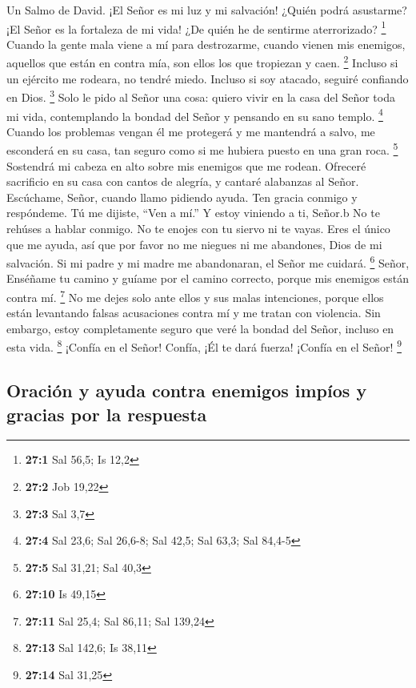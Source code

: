 Un Salmo de David.  ¡El Señor es mi luz y mi salvación!
¿Quién podrá asustarme? ¡El Señor es la fortaleza de mi vida! ¿De quién
he de sentirme aterrorizado? \footnote{\textbf{27:1} Sal 56,5; Is 12,2}
 Cuando la gente mala viene a mí para destrozarme, cuando
vienen mis enemigos, aquellos que están en contra mía, son ellos los que
tropiezan y caen. \footnote{\textbf{27:2} Job 19,22} 
Incluso si un ejército me rodeara, no tendré miedo. Incluso si soy
atacado, seguiré confiando en Dios. \footnote{\textbf{27:3} Sal 3,7}
 Solo le pido al Señor una cosa: quiero vivir en la casa del
Señor toda mi vida, contemplando la bondad del Señor y pensando en su
sano templo. \footnote{\textbf{27:4} Sal 23,6; Sal 26,6-8; Sal 42,5; Sal
  63,3; Sal 84,4-5}  Cuando los problemas vengan él me
protegerá y me mantendrá a salvo, me esconderá en su casa, tan seguro
como si me hubiera puesto en una gran roca. \footnote{\textbf{27:5} Sal
  31,21; Sal 40,3}  Sostendrá mi cabeza en alto sobre mis
enemigos que me rodean. Ofreceré sacrificio en su casa con cantos de
alegría, y cantaré alabanzas al Señor.  Escúchame, Señor,
cuando llamo pidiendo ayuda. Ten gracia conmigo y respóndeme.
 Tú me dijiste, ``Ven a mí.'' Y estoy viniendo a ti, Señor.b
 No te rehúses a hablar conmigo. No te enojes con tu siervo
ni te vayas. Eres el único que me ayuda, así que por favor no me niegues
ni me abandones, Dios de mi salvación.  Si mi padre y mi
madre me abandonaran, el Señor me cuidará. \footnote{\textbf{27:10} Is
  49,15}  Señor, Enséñame tu camino y guíame por el camino
correcto, porque mis enemigos están contra mí. \footnote{\textbf{27:11}
  Sal 25,4; Sal 86,11; Sal 139,24}  No me dejes solo ante
ellos y sus malas intenciones, porque ellos están levantando falsas
acusaciones contra mí y me tratan con violencia.  Sin
embargo, estoy completamente seguro que veré la bondad del Señor,
incluso en esta vida. \footnote{\textbf{27:13} Sal 142,6; Is 38,11}
 ¡Confía en el Señor! Confía, ¡Él te dará fuerza! ¡Confía
en el Señor! \footnote{\textbf{27:14} Sal 31,25}

\hypertarget{oraciuxf3n-y-ayuda-contra-enemigos-impuxedos-y-gracias-por-la-respuesta}{%
\subsection{Oración y ayuda contra enemigos impíos y gracias por la
respuesta}\label{oraciuxf3n-y-ayuda-contra-enemigos-impuxedos-y-gracias-por-la-respuesta}}

